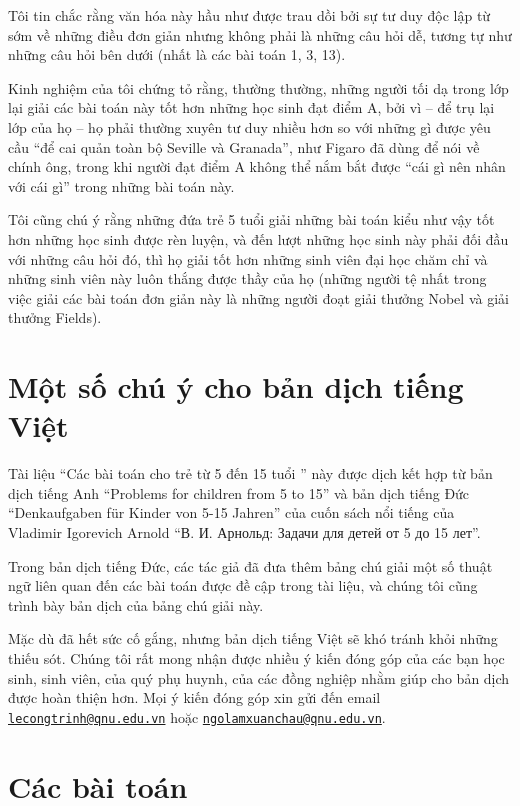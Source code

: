 Tôi tin chắc rằng văn hóa này hầu như được trau dồi bởi sự tư duy độc lập từ sớm về những điều đơn giản nhưng không phải là những câu hỏi dễ, tương tự như những câu hỏi bên dưới (nhất là các bài toán 1, 3, 13).

Kinh nghiệm của tôi chứng tỏ rằng, thường thường, những người tối dạ trong lớp lại giải các bài toán này tốt hơn những học sinh đạt điểm A, bởi vì -- để trụ lại lớp của họ -- họ phải thường xuyên tư duy nhiều hơn so với những gì được yêu cầu \enquote{để cai quản toàn bộ Seville và Granada}, như Figaro đã dùng để nói về chính ông, trong khi người đạt điểm A không thể nắm bắt được \enquote{cái gì nên nhân với cái gì} trong những bài toán này.

Tôi cũng chú ý rằng những đứa trẻ 5 tuổi giải những bài toán kiểu như vậy tốt hơn những học sinh được rèn luyện, và đến lượt những học sinh này phải đối đầu với những câu hỏi đó, thì họ giải tốt hơn những sinh viên đại học chăm chỉ và những sinh viên này luôn thắng được thầy của họ (những người tệ nhất trong việc giải các bài toán đơn giản này là những người đoạt giải thưởng Nobel và giải thưởng Fields).

\clearpage
\section*{Một số chú ý cho bản dịch tiếng Việt}
Tài liệu \enquote{Các bài toán cho trẻ từ 5 đến 15 tuổi } này được dịch kết hợp từ bản dịch tiếng Anh \enquote{Problems for children from 5 to 15} và bản dịch tiếng Đức \enquote{Denkaufgaben f\"{u}r Kinder von 5-15 Jahren} của cuốn sách nổi tiếng của Vladimir Igorevich Arnold {\enquote{{В. И. Арнольд: Задачи для детей от 5 до 15 лет}}}.

Trong bản dịch tiếng Đức, các tác giả đã đưa thêm bảng chú giải một số thuật ngữ liên quan đến các bài toán được đề cập trong tài liệu, và chúng tôi cũng trình bày bản dịch của bảng chú giải này.

Mặc dù đã hết sức cố gắng, nhưng bản dịch tiếng Việt sẽ khó tránh khỏi những thiếu sót. Chúng tôi rất mong nhận được nhiều ý kiến đóng góp của các bạn học sinh, sinh viên, của quý phụ huynh, của các đồng nghiệp nhằm giúp cho bản dịch được hoàn thiện hơn. Mọi ý kiến đóng góp xin gửi đến email \href{mailto:lecongtrinh@qnu.edu.vn}{\nolinkurl{lecongtrinh@qnu.edu.vn}} hoặc \href{mailto:ngolamxuanchau@qnu.edu.vn}{\nolinkurl{ngolamxuanchau@qnu.edu.vn}}. 

\clearpage
\section*{Các bài toán}

